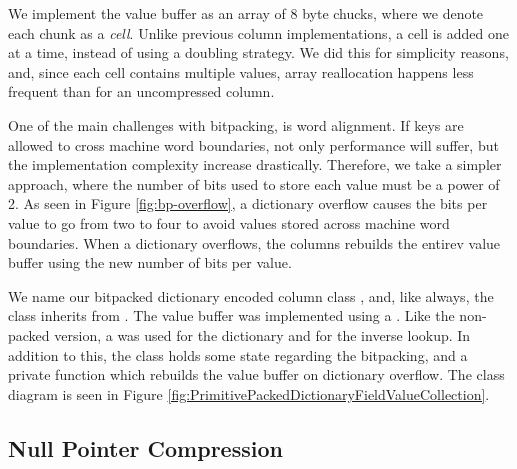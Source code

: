 We implement the value buffer as an array of 8 byte chucks, where we denote each chunk as a \textit{cell}. Unlike previous column implementations, a cell is added one at a time, instead of using a doubling strategy. We did this for simplicity reasons, and, since each cell contains multiple values, array reallocation happens less frequent than for an uncompressed column.

One of the main challenges with bitpacking, is word alignment. If keys are allowed to cross machine word boundaries, not only performance will suffer, but the implementation complexity increase drastically. Therefore, we take a simpler approach, where the number of bits used to store each value must be a power of 2. As seen in Figure \ref{fig:bp-overflow}, a dictionary overflow causes the bits per value to go from two to four to avoid values stored across machine word boundaries. When a dictionary overflows, the columns rebuilds the entirev value buffer using the new number of bits per value.

We name our bitpacked dictionary encoded column class , and, like always, the class inherits from . The value buffer was implemented using a . Like the non-packed version, a  was used for the dictionary and  for the inverse lookup. In addition to this, the class holds some state regarding the bitpacking, and a private function  which rebuilds the value buffer on dictionary overflow. The class diagram is seen in Figure \ref{fig:PrimitivePackedDictionaryFieldValueCollection}.

\subsection{Null Pointer Compression}
\label{sub:Null Pointer Compression}


